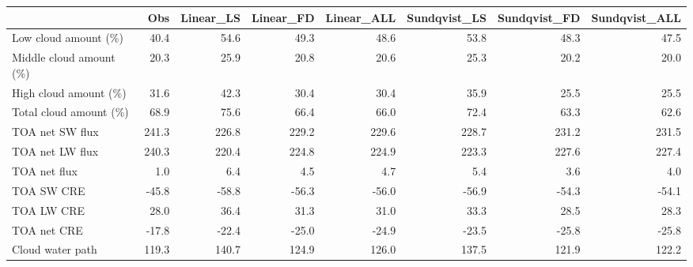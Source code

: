\begin{tabular}{lrrrrrrr}
\toprule
{} &   Obs &  Linear\_LS &  Linear\_FD &  Linear\_ALL &  Sundqvist\_LS &  Sundqvist\_FD &  Sundqvist\_ALL \\
\midrule
Low cloud amount (\%)    &  40.4 &       54.6 &       49.3 &        48.6 &          53.8 &          48.3 &           47.5 \\
Middle cloud amount (\%) &  20.3 &       25.9 &       20.8 &        20.6 &          25.3 &          20.2 &           20.0 \\
High cloud amount (\%)   &  31.6 &       42.3 &       30.4 &        30.4 &          35.9 &          25.5 &           25.5 \\
Total cloud amount (\%)  &  68.9 &       75.6 &       66.4 &        66.0 &          72.4 &          63.3 &           62.6 \\
TOA net SW flux         & 241.3 &      226.8 &      229.2 &       229.6 &         228.7 &         231.2 &          231.5 \\
TOA net LW flux         & 240.3 &      220.4 &      224.8 &       224.9 &         223.3 &         227.6 &          227.4 \\
TOA net flux            &   1.0 &        6.4 &        4.5 &         4.7 &           5.4 &           3.6 &            4.0 \\
TOA SW CRE              & -45.8 &      -58.8 &      -56.3 &       -56.0 &         -56.9 &         -54.3 &          -54.1 \\
TOA LW CRE              &  28.0 &       36.4 &       31.3 &        31.0 &          33.3 &          28.5 &           28.3 \\
TOA net CRE             & -17.8 &      -22.4 &      -25.0 &       -24.9 &         -23.5 &         -25.8 &          -25.8 \\
Cloud water path        & 119.3 &      140.7 &      124.9 &       126.0 &         137.5 &         121.9 &          122.2 \\
\bottomrule
\end{tabular}
